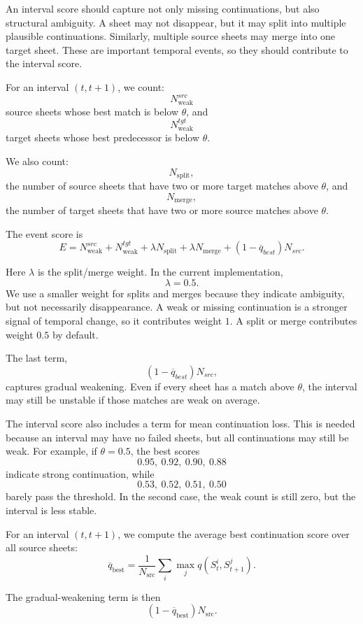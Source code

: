   An interval score should capture not only missing continuations, but also structural ambiguity. A sheet may not
  disappear, but it may split into multiple plausible continuations. Similarly, multiple source sheets may merge into one
  target sheet. These are important temporal events, so they should contribute to the interval score.

  For an interval $(t,t+1)$, we count:
  \[
  N_{\mathrm{weak}}^{src}
  \]
  source sheets whose best match is below $\theta$, and
  \[
  N_{\mathrm{weak}}^{tgt}
  \]
  target sheets whose best predecessor is below $\theta$.

  We also count:
  \[
  N_{\mathrm{split}},
  \]
  the number of source sheets that have two or more target matches above $\theta$, and
  \[
  N_{\mathrm{merge}},
  \]
  the number of target sheets that have two or more source matches above $\theta$.

  The event score is
  \[
  E =
  N_{\mathrm{weak}}^{src}
  +
  N_{\mathrm{weak}}^{tgt}
  +
  \lambda N_{\mathrm{split}}
  +
  \lambda N_{\mathrm{merge}}
  +
  (1-\overline{q}_{best})N_{src}.
  \]

  Here $\lambda$ is the split/merge weight. In the current implementation,
  \[
  \lambda = 0.5.
  \]
  We use a smaller weight for splits and merges because they indicate ambiguity, but not necessarily disappearance. A weak
  or missing continuation is a stronger signal of temporal change, so it contributes weight $1$. A split or merge
  contributes weight $0.5$ by default.

  The last term,
  \[
  (1-\overline{q}_{best})N_{src},
  \]
  captures gradual weakening. Even if every sheet has a match above $\theta$, the interval may still be unstable if those
  matches are weak on average.


  The interval score also includes a term for mean continuation loss. This is needed because an interval may have no failed
  sheets, but all continuations may still be weak. For example, if \(\theta=0.5\), the best scores
  \[
  0.95,\ 0.92,\ 0.90,\ 0.88
  \]
  indicate strong continuation, while
  \[
  0.53,\ 0.52,\ 0.51,\ 0.50
  \]
  barely pass the threshold. In the second case, the weak count is still zero, but the interval is less stable.

  For an interval \((t,t+1)\), we compute the average best continuation score over all source sheets:
  \[
  \overline{q}_{\mathrm{best}}
  =
  \frac{1}{N_{\mathrm{src}}}
  \sum_i
  \max_j q(S_t^i,S_{t+1}^j).
  \]

  The gradual-weakening term is then
  \[
  (1-\overline{q}_{\mathrm{best}})N_{\mathrm{src}}.
  \]

